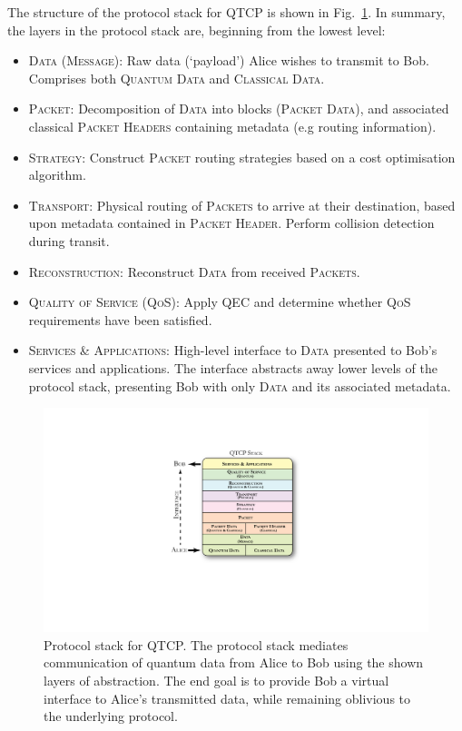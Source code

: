 \documentclass[aps,rmp,twocolumn,amsmath,amssymb,nofootinbib,superscriptaddress,longbibliography,floatfix,table-of-contents,eqsecnum]{revtex4-1}
\begin{document}
The structure of the protocol stack for QTCP is shown in Fig.~\ref{fig:stack}. In summary, the layers in the protocol stack are, beginning from the lowest level:
\begin{itemize}
\item \textsc{Data (Message)}: Raw data (`payload') Alice wishes to transmit to Bob. Comprises both \textsc{Quantum Data} and \textsc{Classical Data}.
\item \textsc{Packet}: Decomposition of \textsc{Data} into blocks (\textsc{Packet Data}), and associated classical \textsc{Packet Headers} containing metadata (e.g routing information).
\item \textsc{Strategy}: Construct \textsc{Packet} routing strategies based on a cost optimisation algorithm.
\item \textsc{Transport}: Physical routing of \textsc{Packets} to arrive at their destination, based upon metadata contained in \textsc{Packet Header}. Perform collision detection during transit.
\item \textsc{Reconstruction}: Reconstruct \textsc{Data} from received \textsc{Packets}.
\item \textsc{Quality of Service (QoS)}: Apply QEC and determine whether \textsc{QoS} requirements have been satisfied.
\item \textsc{Services \& Applications}: High-level interface to \textsc{Data} presented to Bob's services and applications. The interface abstracts away lower levels of the protocol stack, presenting Bob with only \textsc{Data} and its associated metadata.
\end{itemize}

\begin{figure}[!htb]
\includegraphics[width=\columnwidth]{stack}
\caption{Protocol stack for QTCP. The protocol stack mediates communication of quantum data from Alice to Bob using the shown layers of abstraction. The end goal is to provide Bob a virtual interface to Alice's transmitted data, while remaining oblivious to the underlying protocol.} \label{fig:stack}
\end{figure}
\end{document}
